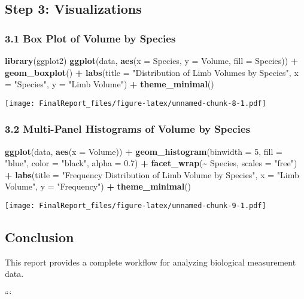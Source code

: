 \documentclass[
]{article}
\newenvironment{Shaded}{\begin{snugshade}}{\end{snugshade}}
\newcommand{\AttributeTok}[1]{\textcolor[rgb]{0.13,0.29,0.53}{#1}}
\newcommand{\DecValTok}[1]{\textcolor[rgb]{0.00,0.00,0.81}{#1}}
\newcommand{\FloatTok}[1]{\textcolor[rgb]{0.00,0.00,0.81}{#1}}
\newcommand{\FunctionTok}[1]{\textcolor[rgb]{0.13,0.29,0.53}{\textbf{#1}}}
\newcommand{\NormalTok}[1]{#1}
\newcommand{\SpecialCharTok}[1]{\textcolor[rgb]{0.81,0.36,0.00}{\textbf{#1}}}
\newcommand{\StringTok}[1]{\textcolor[rgb]{0.31,0.60,0.02}{#1}}
\begin{document}
\subsection{Step 3: Visualizations}\label{step-3-visualizations}

\subsubsection{3.1 Box Plot of Volume by
Species}\label{box-plot-of-volume-by-species}

\begin{Shaded}
\begin{Highlighting}[]
\FunctionTok{library}\NormalTok{(ggplot2)}
\FunctionTok{ggplot}\NormalTok{(data, }\FunctionTok{aes}\NormalTok{(}\AttributeTok{x =}\NormalTok{ Species, }\AttributeTok{y =}\NormalTok{ Volume, }\AttributeTok{fill =}\NormalTok{ Species)) }\SpecialCharTok{+} 
  \FunctionTok{geom\_boxplot}\NormalTok{() }\SpecialCharTok{+} 
  \FunctionTok{labs}\NormalTok{(}\AttributeTok{title =} \StringTok{"Distribution of Limb Volumes by Species"}\NormalTok{, }\AttributeTok{x =} \StringTok{"Species"}\NormalTok{, }\AttributeTok{y =} \StringTok{"Limb Volume"}\NormalTok{) }\SpecialCharTok{+} 
  \FunctionTok{theme\_minimal}\NormalTok{()}
\end{Highlighting}
\end{Shaded}

\texttt{[image: FinalReport\_files/figure-latex/unnamed-chunk-8-1.pdf]}

\subsubsection{3.2 Multi-Panel Histograms of Volume by
Species}\label{multi-panel-histograms-of-volume-by-species}

\begin{Shaded}
\begin{Highlighting}[]
\FunctionTok{ggplot}\NormalTok{(data, }\FunctionTok{aes}\NormalTok{(}\AttributeTok{x =}\NormalTok{ Volume)) }\SpecialCharTok{+} 
  \FunctionTok{geom\_histogram}\NormalTok{(}\AttributeTok{binwidth =} \DecValTok{5}\NormalTok{, }\AttributeTok{fill =} \StringTok{"blue"}\NormalTok{, }\AttributeTok{color =} \StringTok{"black"}\NormalTok{, }\AttributeTok{alpha =} \FloatTok{0.7}\NormalTok{) }\SpecialCharTok{+} 
  \FunctionTok{facet\_wrap}\NormalTok{(}\SpecialCharTok{\textasciitilde{}}\NormalTok{ Species, }\AttributeTok{scales =} \StringTok{"free"}\NormalTok{) }\SpecialCharTok{+} 
  \FunctionTok{labs}\NormalTok{(}\AttributeTok{title =} \StringTok{"Frequency Distribution of Limb Volume by Species"}\NormalTok{, }\AttributeTok{x =} \StringTok{"Limb Volume"}\NormalTok{, }\AttributeTok{y =} \StringTok{"Frequency"}\NormalTok{) }\SpecialCharTok{+} 
  \FunctionTok{theme\_minimal}\NormalTok{()}
\end{Highlighting}
\end{Shaded}

\texttt{[image: FinalReport\_files/figure-latex/unnamed-chunk-9-1.pdf]}

\subsection{Conclusion}\label{conclusion}

This report provides a complete workflow for analyzing biological
measurement data.

```
\end{document}
